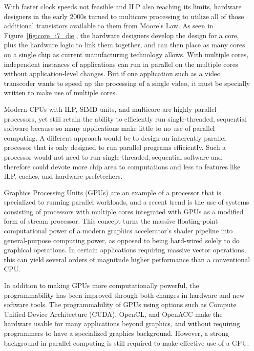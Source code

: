 \documentclass[preprint,sort&compress]{elsarticle}
\begin{document}
With faster clock speeds not feasible and ILP also reaching its limits, hardware designers in the early 2000s turned to multicore processing to utilize all of those additional transistors available to them from Moore's Law.  As seen in Figure~\ref{fig:core_i7_die}, the hardware designers develop the design for a core, plus the hardware logic to link them together, and can then place as many cores on a single chip as current manufacturing technology allows.  With multiple cores, independent instances of applications can run in parallel on the multiple cores without application-level changes.  But if one application such as a video transcoder wants to speed up the processing of a single video, it must be specially written to make use of multiple cores.

Modern CPUs with ILP, SIMD units, and multicore are highly parallel processors, yet still retain the ability to efficiently run single-threaded, sequential software because so many applications make little to no use of parallel computing.  A different approach would be to design an inherently parallel processor that is only designed to run parallel programs efficiently.  Such a processor would not need to run single-threaded, sequential software and therefore could devote more chip area to computations and less to features like ILP, caches, and hardware prefetechers.

Graphics Processing Units (GPUs) are an example of a processor that is specialized to running parallel workloads, and a
recent trend is the use of systems consisting of processors with multiple cores integrated with GPUs as a modified form
of stream processor. This concept turns the massive floating-point computational power of a modern graphics
accelerator's shader pipeline into general-purpose computing power, as opposed to being hard-wired solely to do
graphical operations. In certain applications requiring massive vector operations, this can yield several orders of
magnitude higher performance than a conventional CPU.

In addition to making GPUs more computationally powerful, the programmability has been improved through both changes in hardware and new software tools.  The programmability of GPUs using options such as Compute Unified Device Architecture (CUDA), OpenCL, and OpenACC make the hardware usable for many applications beyond graphics, and without requiring programmers to have a specialized graphics background.  However, a strong background in parallel computing is still required to make effective use of a GPU.
\end{document}
